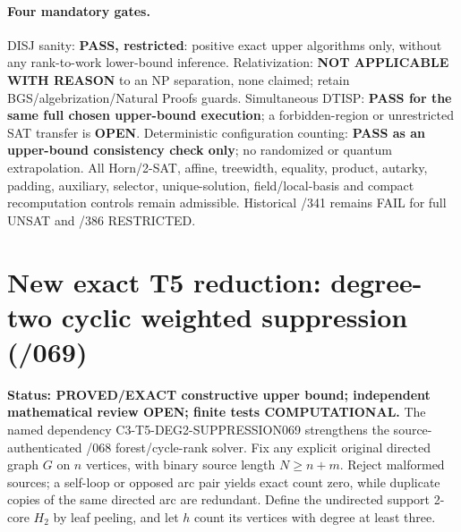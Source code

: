 \documentclass[11pt]{article}
\begin{document}
\paragraph{Four mandatory gates.}
DISJ sanity: \textbf{PASS, restricted}: positive exact upper
algorithms only, without any rank-to-work lower-bound inference.
Relativization: \textbf{NOT APPLICABLE WITH REASON} to an NP
separation, none claimed; retain BGS/algebrization/Natural Proofs
guards. Simultaneous DTISP: \textbf{PASS for the same full chosen
upper-bound execution}; a forbidden-region or unrestricted SAT
transfer is \textbf{OPEN}. Deterministic configuration counting:
\textbf{PASS as an upper-bound consistency check only};
no randomized or quantum extrapolation. All Horn/2-SAT, affine,
treewidth, equality, product, autarky, padding, auxiliary,
selector, unique-solution, field/local-basis and compact
recomputation controls remain admissible. Historical /341
remains FAIL for full UNSAT and /386 RESTRICTED.


\section{New exact T5 reduction: degree-two cyclic weighted suppression (/069)}

\noindent\textbf{Status: PROVED/EXACT constructive upper bound;
independent mathematical review OPEN; finite tests COMPUTATIONAL.}
The named dependency \textsf{C3-T5-DEG2-SUPPRESSION069}
strengthens the source-authenticated /068 forest/cycle-rank solver.
Fix any explicit original directed graph $G$ on $n$ vertices, with
binary source length $N\ge n+m$. Reject malformed sources; a
self-loop or opposed arc pair yields exact count zero, while
duplicate copies of the same directed arc are redundant.
Define the undirected support 2-core $H_2$ by leaf peeling, and
let $h$ count its vertices with degree at least three.
\end{document}
